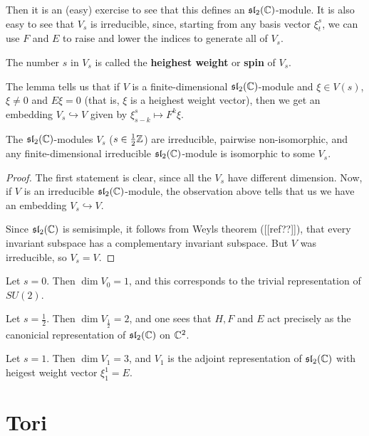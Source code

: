 \documentclass[11pt, english]{article}
\begin{document}
Then it is an (easy) exercise to see that this defines an $\mathfrak{sl}_2(\mathbb{C})$-module. It is also easy to see that $V_s$ is irreducible, since, starting from any basis vector $\xi_t^s$, we can use $F$ and $E$ to raise and lower the indices to generate all of $V_s$.

The number $s$ in $V_s$ is called the \textbf{heighest weight} or \textbf{spin} of $V_s$.

The lemma tells us that if $V$ is a finite-dimensional $\mathfrak{sl}_2(\mathbb{C})$-module and $\xi \in V(s)$, $\xi \neq 0$ and $E \xi = 0$ (that is, $\xi$ is a heighest weight vector), then we get an embedding $V_s \hookrightarrow V$ given by $\xi_{s-k}^s \mapsto F^k \xi$.

\begin{thm}
\label{thmsl2}
 The $\mathfrak{sl}_2(\mathbb{C})$-modules $V_s$ ($s \in  \frac 12 \mathbb{Z}$) are irreducible, pairwise non-isomorphic, and any finite-dimensional irreducible $\mathfrak{sl}_2(\mathbb{C})$-module is isomorphic to some $V_s$.
\end{thm}
\begin{proof}
The first statement is clear, since all the $V_s$ have different dimension. Now, if $V$ is an irreducible $\mathfrak{sl}_2(\mathbb{C})$-module, the observation above tells that us we have an embedding $V_s \hookrightarrow V$.

Since $\mathfrak{sl}_2(\mathbb{C})$ is semisimple, it follows from Weyls theorem ([[ref??]]), that every invariant subspace has a complementary invariant subspace. But $V$ was irreducible, so $V_s=V$.
\end{proof}

\begin{example}
  Let $s=0$. Then $\dim V_0 = 1$, and this corresponds to the trivial representation of $SU(2)$. 
\end{example}

\begin{example}
 Let $s=\frac 12$. Then $\dim V_{\frac 12} = 2$, and one sees that $H,F$ and $E$ act precisely as the canonicial representation of $\mathfrak{sl}_2(\mathbb{C})$ on $\mathbb{C}^2$. 
\end{example}

\begin{example}
Let $s=1$. Then $\dim V_1 = 3$, and $V_1$ is the adjoint representation of $\mathfrak{sl}_2(\mathbb{C})$ with heigest weight vector $\xi_1^1 = E$. 
\end{example}



\newpage
\section{Tori}
\end{document}
